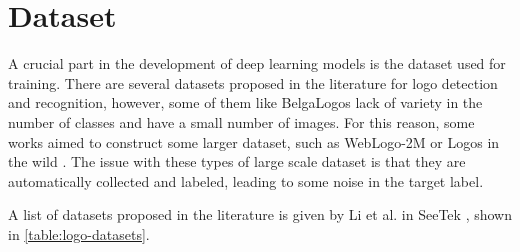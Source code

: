 \chapter{Dataset}
\label{chap:dataset}

A crucial part in the development of deep learning models is the dataset used for training. There are several datasets proposed in the literature for logo detection and recognition, however, some of them like BelgaLogos \cite{neumann2002integration} lack of variety in the number of classes and have a small number of images. For this reason, some works aimed to construct some larger dataset, such as WebLogo-2M \cite{su2017weblogo} or Logos in the wild \cite{tuzko2017open}. The issue with these types of large scale dataset is that they are automatically collected and labeled, leading to some noise in the target label.

A list of datasets proposed in the literature is given by Li et al. in SeeTek \cite{li2022seetek}, shown in \autoref{table:logo-datasets}.

